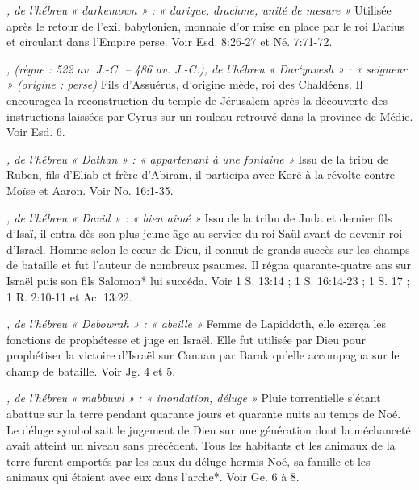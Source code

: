 \begin{multicols}{2}
{\textit{, de l'hébreu « darkemown » : « darique, drachme, unité de mesure »}\newline
Utilisée après le retour de l'exil babylonien, monnaie d'or mise en place par le roi Darius et circulant dans l'Empire perse. Voir Esd. 8:26-27 et Né. 7:71-72.

\textit{, (règne : 522 av. J.-C. – 486 av. J.-C.), de l'hébreu « Dar`yavesh » : « seigneur » (origine : perse)}\newline
Fils d'Assuérus, d'origine mède, roi des Chaldéens. Il encouragea la reconstruction du temple de Jérusalem après la découverte des instructions laissées par Cyrus sur un rouleau retrouvé dans la province de Médie. Voir Esd. 6.

\textit{, de l'hébreu « Dathan » : « appartenant à une fontaine »}\newline
Issu de la tribu de Ruben, fils d'Eliab et frère d'Abiram, il participa avec Koré à la révolte contre Moïse et Aaron. Voir No. 16:1-35.

\textit{, de l'hébreu « David » : « bien aimé »}\newline
Issu de la tribu de Juda et dernier fils d'Isaï, il entra dès son plus jeune âge au service du roi Saül avant de devenir roi d'Israël. Homme selon le cœur de Dieu, il connut de grands succès sur les champs de bataille et fut l'auteur de nombreux psaumes. Il régna quarante-quatre ans sur Israël puis son fils Salomon* lui succéda. Voir 1 S. 13:14 ; 1 S. 16:14-23 ; 1 S. 17 ; 1 R. 2:10-11 et Ac. 13:22.

\textit{, de l'hébreu « Debowrah » : « abeille »}\newline
Femme de Lapiddoth, elle exerça les fonctions de prophétesse et juge en Israël. Elle fut utilisée par Dieu pour prophétiser la victoire d'Israël sur Canaan par Barak qu'elle accompagna sur le champ de bataille. Voir Jg. 4 et 5.

\textit{, de l'hébreu « mabbuwl » : « inondation, déluge »}\newline
Pluie torrentielle s'étant abattue sur la terre pendant quarante jours et quarante nuits au temps de Noé. Le déluge symbolisait le jugement de Dieu sur une génération dont la méchanceté avait atteint un niveau sans précédent. Tous les habitants et les animaux de la terre furent emportés par les eaux du déluge hormis Noé, sa famille et les animaux qui étaient avec eux dans l'arche*. Voir Ge. 6 à 8.

}
\end{multicols}
